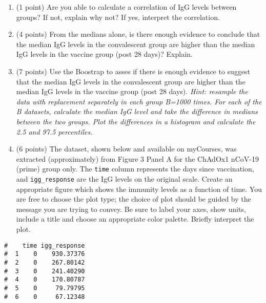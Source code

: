 \documentclass[letterpaper,12pt,twoside,]{pinp}
\providecommand{\tightlist}{%
  \setlength{\itemsep}{0pt}\setlength{\parskip}{0pt}}
\begin{document}
\begin{enumerate}
\def\labelenumi{\alph{enumi})}
\setcounter{enumi}{4}
\tightlist
\item
  (1 point) Are you able to calculate a correlation of IgG levels
  between groups? If not, explain why not? If yes, interpret the
  correlation.
\item
  (4 points) From the medians alone, is there enough evidence to
  conclude that the median IgG levels in the convalescent group are
  higher than the median IgG levels in the vaccine group (post 28 days)?
  Explain.
\item
  (7 points) Use the Boostrap to asses if there is enough evidence to
  suggest that the median IgG levels in the convalescent group are
  higher than the median IgG levels in the vaccine group (post 28 days).
  \emph{Hint: resample the data with replacement separately in each
  group B=1000 times. For each of the B datasets, calculate the median
  IgG level and take the difference in medians between the two groups.
  Plot the differences in a histogram and calculate the 2.5 and 97.5
  percentiles.}
\item
  (6 points) The dataset, shown below and available on myCourses, was
  extracted (approximately) from Figure 3 Panel A for the ChAdOx1
  nCoV-19 (prime) group only. The \texttt{time} column represents the
  days since vaccination, and \texttt{igg\_response} are the IgG levels
  on the original scale. Create an appropriate figure which shows the
  immunity levels as a function of time. You are free to choose the plot
  type; the choice of plot should be guided by the message you are
  trying to convey. Be sure to label your axes, show units, include a
  title and choose an appropriate color palette. Briefly interpret the
  plot.
\end{enumerate}

\begin{Shaded}
\begin{Highlighting}[]
\StringTok{ }\NormalTok{(}\NormalTok{)}
\end{Highlighting}
\end{Shaded}

\begin{Shaded}
\begin{Highlighting}[]
\end{Highlighting}
\end{Shaded}

\begin{ShadedResult}
\begin{verbatim}
#    time igg_response
#  1    0    930.37376
#  2    0    267.80142
#  3    0    241.40290
#  4    0    170.80787
#  5    0     79.79795
#  6    0     67.12348
\end{verbatim}
\end{ShadedResult}
\end{document}
